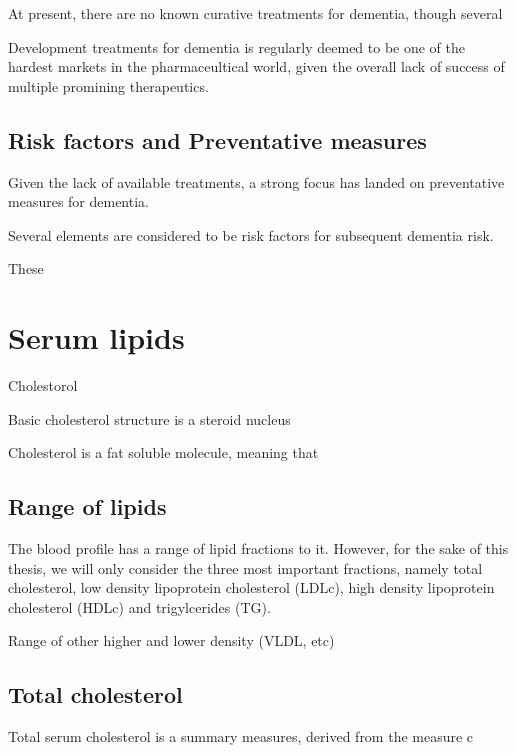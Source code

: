 \documentclass[a4paper, twoside]{templates/ociamthesis}
\begin{document}
At present, there are no known curative treatments for dementia, though several

Development treatments for dementia is regularly deemed to be one of the hardest markets in the pharmaceultical world, given the overall lack of success of multiple promining therapeutics.

\hypertarget{risk-factors-and-preventative-measures}{%
\subsection{Risk factors and Preventative measures}\label{risk-factors-and-preventative-measures}}

Given the lack of available treatments, a strong focus has landed on preventative measures for dementia.

Several elements are considered to be risk factors for subsequent dementia risk.

These

\hypertarget{serum-lipids}{%
\section{Serum lipids}\label{serum-lipids}}

Cholestorol

Basic cholesterol structure is a steroid nucleus

Cholesterol is a fat soluble molecule, meaning that

\hypertarget{range-of-lipids}{%
\subsection{Range of lipids}\label{range-of-lipids}}

The blood profile has a range of lipid fractions to it. However, for the sake of this thesis, we will only consider the three most important fractions, namely total cholesterol, low density lipoprotein cholesterol (LDLc), high density lipoprotein cholesterol (HDLc) and trigylcerides (TG).

Range of other higher and lower density (VLDL, etc)

\hypertarget{total-cholesterol}{%
\subsection{Total cholesterol}\label{total-cholesterol}}

Total serum cholesterol is a summary measures, derived from the measure c
\end{document}
